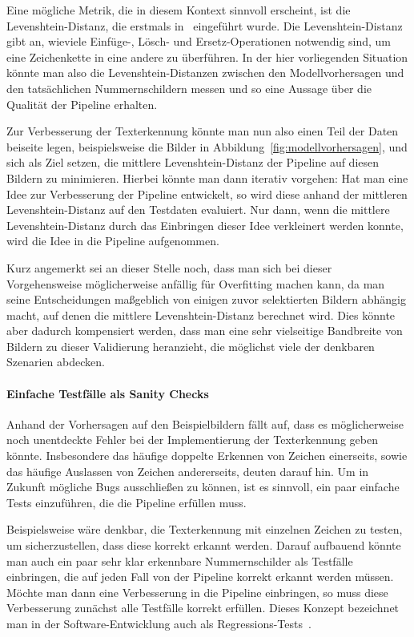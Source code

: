 Eine m\"ogliche Metrik, die in diesem Kontext sinnvoll erscheint,
ist die Levenshtein-Distanz, die erstmals in~\cite{levenshtein}
eingef\"uhrt wurde.
Die Levenshtein-Distanz gibt an, wieviele Einf\"uge-, L\"osch- und
Ersetz-Operationen notwendig sind, um eine Zeichenkette in eine
andere zu \"uberf\"uhren.
In der hier vorliegenden Situation k\"onnte man also die
Levenshtein-Distanzen zwischen den Modellvorhersagen und den
tats\"achlichen Nummernschildern messen und so eine Aussage \"uber
die Qualit\"at der Pipeline erhalten.

Zur Verbesserung der Texterkennung k\"onnte man nun also einen Teil der
Daten beiseite legen, beispielsweise die Bilder in Abbildung~\ref{fig:modellvorhersagen},
und sich als Ziel setzen, die mittlere Levenshtein-Distanz der
Pipeline auf diesen Bildern zu minimieren.
Hierbei k\"onnte man dann iterativ vorgehen: Hat man eine Idee zur
Verbesserung der Pipeline entwickelt, so wird diese anhand der
mittleren Levenshtein-Distanz auf den Testdaten evaluiert.
Nur dann, wenn die mittlere Levenshtein-Distanz durch das Einbringen
dieser Idee verkleinert werden konnte, wird die Idee in die Pipeline
aufgenommen.

Kurz angemerkt sei an dieser Stelle noch, dass man sich bei dieser
Vorgehensweise m\"oglicherweise anf\"allig f\"ur Overfitting
machen kann, da man seine Entscheidungen ma{\ss}geblich von einigen zuvor
selektierten Bildern abh\"angig macht, auf denen die mittlere
Levenshtein-Distanz berechnet wird.
Dies k\"onnte aber dadurch kompensiert werden, dass man eine sehr
vielseitige Bandbreite von Bildern zu dieser Validierung heranzieht,
die m\"oglichst viele der denkbaren Szenarien abdecken.

\paragraph{Einfache Testf\"alle als \glqq Sanity Checks\grqq{}}

Anhand der Vorhersagen auf den Beispielbildern f\"allt auf, dass es
m\"oglicherweise noch unentdeckte Fehler bei der Implementierung der
Texterkennung geben k\"onnte. Insbesondere das h\"aufige doppelte Erkennen
von Zeichen einerseits, sowie das h\"aufige Auslassen von Zeichen
andererseits,
deuten darauf hin. Um in Zukunft m\"ogliche \glqq Bugs\grqq{} ausschlie{\ss}en
zu k\"onnen, ist es sinnvoll, ein paar einfache Tests einzuf\"uhren,
die die Pipeline erf\"ullen muss.

Beispielsweise w\"are denkbar, die Texterkennung mit einzelnen Zeichen zu
testen, um sicherzustellen, dass diese korrekt erkannt werden.
Darauf aufbauend k\"onnte man auch ein paar sehr klar erkennbare
Nummernschilder als Testf\"alle einbringen, die auf jeden Fall von
der Pipeline korrekt erkannt werden m\"ussen.
M\"ochte man dann eine Verbesserung in die Pipeline einbringen, so
muss diese Verbesserung zun\"achst alle Testf\"alle korrekt erf\"ullen.
Dieses Konzept bezeichnet man in der Software-Entwicklung auch als
Regressions-Tests~\cite{testing}.

